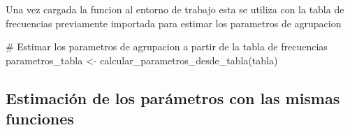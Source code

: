 \documentclass[
  spanish,
  letterpaper,
]{book}
\newenvironment{Shaded}{\begin{snugshade}}{\end{snugshade}}
\newcommand{\AttributeTok}[1]{\textcolor[rgb]{0.40,0.45,0.13}{#1}}
\newcommand{\CommentTok}[1]{\textcolor[rgb]{0.37,0.37,0.37}{#1}}
\newcommand{\ControlFlowTok}[1]{\textcolor[rgb]{0.00,0.23,0.31}{\textbf{#1}}}
\newcommand{\DecValTok}[1]{\textcolor[rgb]{0.68,0.00,0.00}{#1}}
\newcommand{\FunctionTok}[1]{\textcolor[rgb]{0.28,0.35,0.67}{#1}}
\newcommand{\NormalTok}[1]{\textcolor[rgb]{0.00,0.23,0.31}{#1}}
\newcommand{\OtherTok}[1]{\textcolor[rgb]{0.00,0.23,0.31}{#1}}
\newcommand{\SpecialCharTok}[1]{\textcolor[rgb]{0.37,0.37,0.37}{#1}}
\begin{document}
\begin{Shaded}
\end{Shaded}

Una vez cargada la funcion al entorno de trabajo esta se utiliza con la
tabla de frecuencias previamente importada para estimar los parametros
de agrupacion

\begin{Shaded}
\begin{Highlighting}[]
\CommentTok{\# Estimar los parametros de agrupacion a partir de la tabla de frecuencias}
\NormalTok{parametros\_tabla }\OtherTok{\textless{}{-}} \FunctionTok{calcular\_parametros\_desde\_tabla}\NormalTok{(tabla)}
\end{Highlighting}
\end{Shaded}

\subsection{Estimación de los parámetros con las mismas
funciones}\label{estimaciuxf3n-de-los-paruxe1metros-con-las-mismas-funciones}
\end{document}
